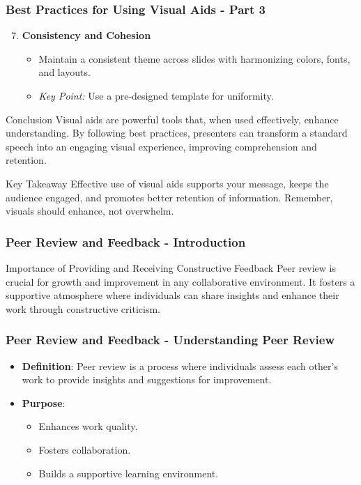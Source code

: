 \documentclass[aspectratio=169]{beamer}
\begin{document}
\begin{frame}[fragile]
    \frametitle{Best Practices for Using Visual Aids - Part 3}
    \begin{enumerate}
        \setcounter{enumi}{6}
        \item \textbf{Consistency and Cohesion}
        \begin{itemize}
            \item Maintain a consistent theme across slides with harmonizing colors, fonts, and layouts.
            \item \textit{Key Point:} Use a pre-designed template for uniformity.
        \end{itemize}
    \end{enumerate}
    
    \begin{block}{Conclusion}
        Visual aids are powerful tools that, when used effectively, enhance understanding. By following best practices, presenters can transform a standard speech into an engaging visual experience, improving comprehension and retention.
    \end{block}
    
    \begin{block}{Key Takeaway}
        Effective use of visual aids supports your message, keeps the audience engaged, and promotes better retention of information. Remember, visuals should enhance, not overwhelm.
    \end{block}
\end{frame}

\begin{frame}[fragile]
    \frametitle{Peer Review and Feedback - Introduction}
    \begin{block}{Importance of Providing and Receiving Constructive Feedback}
        Peer review is crucial for growth and improvement in any collaborative environment. It fosters a supportive atmosphere where individuals can share insights and enhance their work through constructive criticism.
    \end{block}
\end{frame}

\begin{frame}[fragile]
    \frametitle{Peer Review and Feedback - Understanding Peer Review}
    \begin{itemize}
        \item \textbf{Definition}: Peer review is a process where individuals assess each other's work to provide insights and suggestions for improvement.
        \item \textbf{Purpose}: 
        \begin{itemize}
            \item Enhances work quality.
            \item Fosters collaboration.
            \item Builds a supportive learning environment.
        \end{itemize}
    \end{itemize}
\end{frame}
\end{document}
